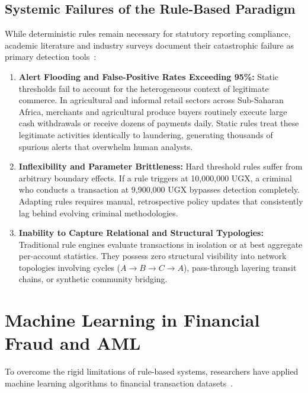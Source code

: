 \subsection{Systemic Failures of the Rule-Based Paradigm}
While deterministic rules remain necessary for statutory reporting compliance, academic literature and industry surveys document their catastrophic failure as primary detection tools~\cite{bellomarini2020rule, harris2022using, svensson2021dirty}:
\begin{enumerate}
    \item \textbf{Alert Flooding and False-Positive Rates Exceeding 95\%:} Static thresholds fail to account for the heterogeneous context of legitimate commerce. In agricultural and informal retail sectors across Sub-Saharan Africa, merchants and agricultural produce buyers routinely execute large cash withdrawals or receive dozens of payments daily. Static rules treat these legitimate activities identically to laundering, generating thousands of spurious alerts that overwhelm human analysts.
    \item \textbf{Inflexibility and Parameter Brittleness:} Hard threshold rules suffer from arbitrary boundary effects. If a rule triggers at 10,000,000 UGX, a criminal who conducts a transaction at 9,900,000 UGX bypasses detection completely. Adapting rules requires manual, retrospective policy updates that consistently lag behind evolving criminal methodologies.
    \item \textbf{Inability to Capture Relational and Structural Typologies:} Traditional rule engines evaluate transactions in isolation or at best aggregate per-account statistics. They possess zero structural visibility into network topologies involving cycles ($A \rightarrow B \rightarrow C \rightarrow A$), pass-through layering transit chains, or synthetic community bridging.
\end{enumerate}

\section{Machine Learning in Financial Fraud and AML}
To overcome the rigid limitations of rule-based systems, researchers have applied machine learning algorithms to financial transaction datasets~\cite{han2020artificial, huck2019large}.

